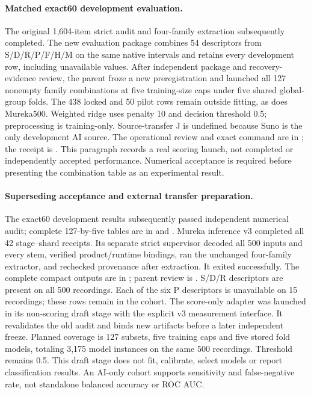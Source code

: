 \paragraph{Matched exact60 development evaluation.}
The original 1,604-item strict audit and four-family extraction subsequently
completed. The new evaluation package combines 54 descriptors from S/D/R/P/F/H/M
on the same native intervals and retains every development row, including
unavailable values. After independent package and recovery-evidence review,
the parent froze a new preregistration and launched all 127 nonempty family
combinations at five training-size caps under five shared global-group folds.
The 438 locked and 50 pilot rows remain outside fitting, as does Mureka500.
Weighted ridge uses penalty 10 and decision threshold 0.5; preprocessing is
training-only. Source-transfer J is undefined because Suno is the only
development AI source. The operational review and exact command are in
; the receipt is
.
This paragraph records a real scoring launch, not completed or independently
accepted performance. Numerical acceptance is required before presenting the
combination table as an experimental result.

\paragraph{Superseding acceptance and external transfer preparation.}
The exact60 development results subsequently passed independent numerical
audit; complete 127-by-five tables are in
 and
.
Mureka inference v3 completed all 42 stage--shard receipts. Its separate strict
supervisor decoded all 500 inputs and every stem, verified product/runtime
bindings, ran the unchanged four-family extractor, and rechecked provenance
after extraction. It exited successfully. The complete compact outputs are in
; parent review is
.
S/D/R descriptors are present on all 500 recordings. Each of the six P
descriptors is unavailable on 15 recordings; these rows remain in the cohort.
The score-only adapter  was launched in
its non-scoring draft stage with the explicit v3 measurement interface.
It revalidates the old audit and binds new artifacts before a later independent
freeze. Planned coverage is 127 subsets, five training caps and five stored fold
models, totaling 3,175 model instances on the same 500 recordings. Threshold
remains 0.5. This draft stage does not fit, calibrate, select models or report
classification results. An AI-only cohort supports sensitivity and false-negative
rate, not standalone balanced accuracy or ROC AUC.

